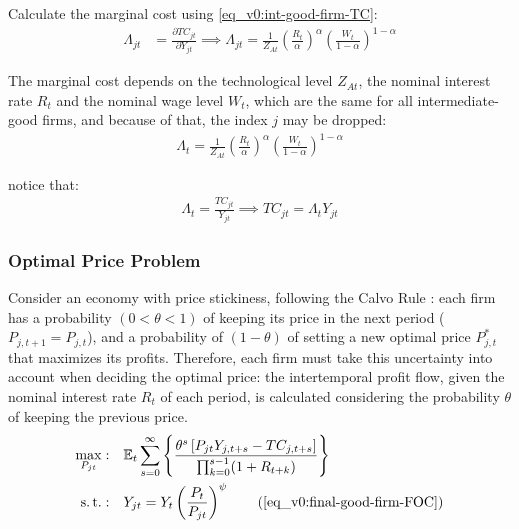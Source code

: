 \documentclass[
thesis.tex
]{subfiles}
\begin{document}
	
	Calculate the marginal cost using \ref{eq_v0:int-good-firm-TC}: 
	\begin{align}
		\label{eq_v0:int-good-firm-MC}
		\Lambda_{jt} & = \frac{\partial TC_{jt}}{\partial Y_{jt}}
		\implies 
		\Lambda_{jt} = \frac{1}{Z_{At}} \left( \frac{R_t}{\alpha} \right)^{\alpha} \left( \frac{W_t}{1-\alpha} \right)^{1-\alpha}
	\end{align}
	
	The marginal cost depends on the technological level $Z_{At}$, the nominal interest rate $R_t$ and the nominal wage level $W_t$, which are the same for all intermediate-good firms, and because of that, the index $j$ may be dropped:
	\begin{align}
		\label{eq_v0:int-good-firm-MC-2}
		\Lambda_t = \frac{1}{Z_{At}} \left( \frac{R_t}{\alpha} \right)^{\alpha} \left( \frac{W_t}{1-\alpha} \right)^{1-\alpha}
	\end{align}
	
	notice that:
	\begin{align}
		\label{eq_v0:int-good-firm-TC-MC}
		\Lambda_t = \frac{TC_{jt}}{Y_{jt}} \implies 
		TC_{jt} = \Lambda_t Y_{jt}
	\end{align}
	
	
	\subsubsection*{Optimal Price Problem}
	
	Consider an economy with price stickiness, following the Calvo Rule \cite{calvo_staggered_1983}: each firm has a probability $(0 < \theta < 1)$ of keeping its price in the next period ($P_{j,t+1} = P_{j,t}$), and a probability of $(1 - \theta)$ of setting a new optimal price $P_{j,t}^\ast$ that maximizes its profits. Therefore, each firm must take this uncertainty into account when deciding the optimal price: the intertemporal profit flow, given the nominal interest rate $R_t$ of each period, is calculated considering the probability $\theta$ of keeping the previous price.
	\begin{align}
		\max_{P_{jt}}: & \quad \E \sum_{s=0}^{\infty} \left\{ \frac{ \theta^s \left[ P_{jt} Y_{j,t+s} - TC_{j,t+s} \right] }{\prod_{k=0}^{s-1}(1+R_{t+k})} \right\} \label{eq_v0:int-good-firm-optimal-price-problem} \\
		\st: & \quad Y_{jt} = Y_t \left( \frac{P_t}{P_{jt}} \right)^{\psi} \tag{\ref{eq_v0:final-good-firm-FOC}}
	\end{align}
	
\end{document}
